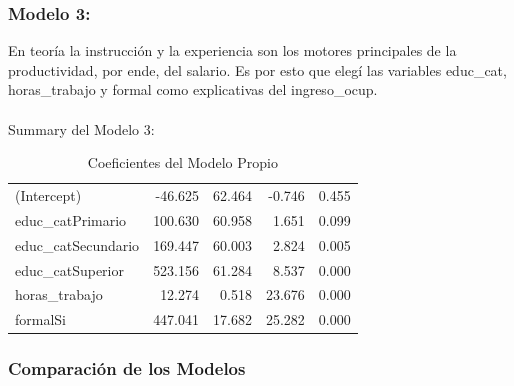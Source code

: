 \documentclass[
  spanish,
  letterpaper,
  DIV=11,
  numbers=noendperiod]{scrartcl}
\makeatletter
\let\oldparagraph\paragraph
\renewcommand{\paragraph}{
    \@ifstar
      \xxxParagraphStar
      \xxxParagraphNoStar
  }
\newcommand{\xxxParagraphStar}[1]{\oldparagraph*{#1}\mbox{}}
\newcommand{\xxxParagraphNoStar}[1]{\oldparagraph{#1}\mbox{}}
\makeatother
\begin{document}
\subsubsection{Modelo 3:}\label{modelo-3}

En teoría la instrucción y la experiencia son los motores principales de
la productividad, por ende, del salario. Es por esto que elegí las
variables educ\_cat, horas\_trabajo y formal como explicativas del
ingreso\_ocup.

\paragraph{Summary del Modelo 3:}\label{summary-del-modelo-3}

\begin{longtable}[t]{lrrrr}
\caption{\label{tab:unnamed-chunk-4}Coeficientes del Modelo Propio}\\
\toprule
\cellcolor{black}{\textcolor{white}{Término}} & \cellcolor{black}{\textcolor{white}{Estimación}} & \cellcolor{black}{\textcolor{white}{Error Est.}} & \cellcolor{black}{\textcolor{white}{Estadístico t}} & \cellcolor{black}{\textcolor{white}{p-valor}}\\
\midrule
(Intercept) & -46.625 & 62.464 & -0.746 & 0.455\\
educ\_catPrimario & 100.630 & 60.958 & 1.651 & 0.099\\
educ\_catSecundario & 169.447 & 60.003 & 2.824 & 0.005\\
educ\_catSuperior & 523.156 & 61.284 & 8.537 & 0.000\\
horas\_trabajo & 12.274 & 0.518 & 23.676 & 0.000\\
\addlinespace
formalSi & 447.041 & 17.682 & 25.282 & 0.000\\
\bottomrule
\end{longtable}

\subsubsection{Comparación de los
Modelos}\label{comparaciuxf3n-de-los-modelos}
\end{document}
